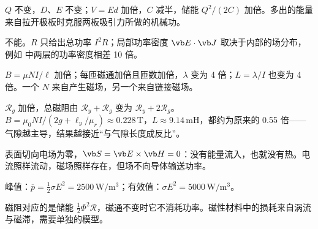\begin{answers}
\item $Q$ 不变，$D$、$E$ 不变；$V=Ed$ 加倍，$C$ 减半，储能 $Q^2/(2C)$ 加倍。多出的能量来自拉开极板时克服两板吸引力所做的机械功。
\item 不能。$R$ 只给出总功率 $I^2R$；局部功率密度 $\vb E\cdot\vb J$ 取决于内部的场分布，例如 中两层的功率密度相差 10 倍。
\item $B=\mu NI/\ell$ 加倍；每匝磁通加倍且匝数加倍，$\lambda$ 变为 4 倍；$L=\lambda/I$ 也变为 4 倍。一个 $N$ 来自产生磁场，另一个来自链接磁场。
\item $\mathcal R_g$ 加倍，总磁阻由 $\mathcal R_y+\mathcal R_g$ 变为 $\mathcal R_y+2\mathcal R_g$。$B=\mu_0NI/(2g+\ell_y/\mu_r)\approx0.228\,\mathrm T$，$L\approx9.14\,\mathrm{mH}$，都约为原来的 0.55 倍——气隙越主导，结果越接近“与气隙长度成反比”。
\item 表面切向电场为零，$\vb S=\vb E\times\vb H=0$：没有能量流入，也就没有热。电流照样流动，磁场照样存在，但场不向导体输送功率。
\item 峰值：$\overline p=\tfrac12\sigma E^2=2500\,\mathrm{W/m^3}$；有效值：$\sigma E^2=5000\,\mathrm{W/m^3}$。
\item 磁阻对应的是储能 $\tfrac12\Phi^2\mathcal R$，磁通不变时它不消耗功率。磁性材料中的损耗来自涡流与磁滞，需要单独的模型。
\end{answers}
